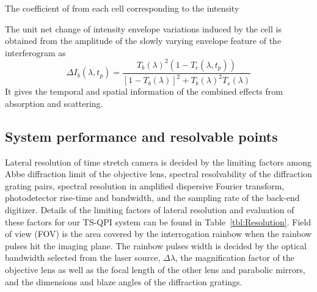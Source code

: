 \documentclass[aps,pra,reprint,superscriptaddress]{revtex4-1}
\begin{document}
The coefficient of  from each cell corresponding to the intensity  

The unit net change of intensity envelope variations induced by the cell is obtained from the amplitude of the slowly varying envelope feature of the interferogram as
\begin{equation}
\Delta I_b(\lambda, t_p) = \frac{T_b(\lambda)^2 (1 - T_c(\lambda, t_p))}{[1-T_b(\lambda)]^2 + T_b(\lambda)^2 T_s(\lambda)}
\end{equation}
It gives the temporal and spatial information of the combined effects from absorption and scattering. 


\subsection{System performance and resolvable points}

Lateral resolution of time stretch camera is decided by the limiting factors among Abbe diffraction limit of the objective lens, spectral resolvability of the diffraction grating pairs, spectral resolution in amplified dispersive Fourier transform, photodetector rise-time and bandwidth, and the sampling rate of the back-end digitizer. Details of the limiting factors of lateral resolution and evaluation of these factors for our TS-QPI system can be found in Table~\ref{tbl:Resolution}. Field of view (FOV) is the area covered by the interrogation rainbow when the rainbow pulses hit the imaging plane. The rainbow pulses width is decided by the optical bandwidth selected from the laser source, $\Delta\lambda$, the magnification factor of the objective lens as well as the focal length of the other lens and parabolic mirrors, and the dimensions and blaze angles of the diffraction gratings.
\end{document}
